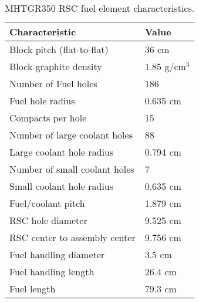 \documentclass[11pt,letterpaper]{article}
\begin{document}
	\begin{table}[H]
		\centering
	    \caption{MHTGR350 RSC fuel element characteristics.}
	    \label{tab:rcharacteristics}
		\begin{tabular}{l|l}
		\hline
		Characteristic                   & Value         \\ \hline
		Block pitch (flat-to-flat)       & 36 cm         \\
		Block graphite density           & 1.85 g/cm$^3$ \\
		Number of Fuel holes             & 186           \\
		Fuel hole radius                 & 0.635 cm      \\
		Compacts per hole                & 15            \\
		Number of large coolant holes    & 88            \\
		Large coolant hole radius        & 0.794 cm      \\
		Number of small coolant holes    & 7             \\
		Small coolant hole radius        & 0.635 cm      \\
		Fuel/coolant pitch               & 1.879 cm      \\ 
		RSC hole diameter                & 9.525 cm      \\
		RSC center to assembly center    & 9.756 cm      \\
		Fuel handling diameter           & 3.5 cm        \\ 
		Fuel handling length             & 26.4 cm       \\
		Fuel length                      & 79.3 cm       \\ \hline
		\end{tabular}
	\end{table}

\pagebreak


\end{document}
